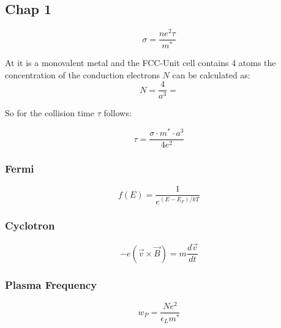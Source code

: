 \subsection{Chap 1 } \label{chap1}

\begin{equation}
    \sigma = \frac{n e^2 \tau}{m^*}
\end{equation}


At it is a monovalent metal and the FCC-Unit cell contains 
4 atoms the concentration of the conduction electrons $N$ can be
calculated as:
$$N =\frac{4}{a^3} = $$

So for the collision time $\tau$ follows:

$$\tau = \frac{\sigma \cdot m^* \cdot a^3}{4e^2}$$

\subsubsection*{Fermi}

\begin{equation}
    f(E) = \frac{1}{e^{(E-E_F)/kT}}
\end{equation}

\subsubsection*{Cyclotron}
\begin{equation}
    -e (\vec{v} \times \vec{B}) =  m \frac{d\vec{v}}{dt}
\end{equation}

\subsubsection*{Plasma Frequency}

\begin{equation}
    w_P = \frac{Ne^2}{\epsilon_L m^*}
\end{equation}